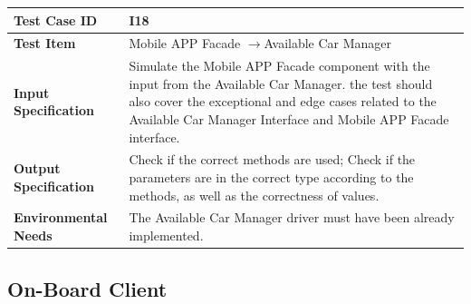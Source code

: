 \documentclass[a4paper,11pt]{article}
\begin{document}
\begin{table}[H] 
\begin{center}
\renewcommand\arraystretch{1.5}
\begin{tabular}{|p{5cm}|p{7cm}|}
 \hline
\textbf{Test Case ID}& I18\\
 \hline
\textbf{Test Item}&Mobile APP Facade $\rightarrow$Available Car Manager\\
 \hline
\textbf{Input Specification}&Simulate the Mobile APP Facade component with the input from the Available Car Manager. the test should also cover the exceptional and edge cases related to the Available Car Manager Interface and Mobile APP Facade interface.\\
 \hline
\textbf{Output Specification}&Check if the correct methods are used;
Check if the parameters are in the correct type according to the methods, as well as the correctness of values.\\
 \hline
 \textbf{Environmental Needs}&The Available Car Manager driver must have been already implemented.\\
 \hline
\end{tabular}
\end{center}
\end{table}		
	
	\subsection{On-Board Client}
\end{document}
